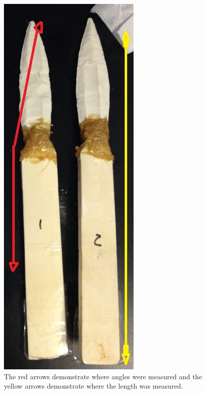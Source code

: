 \begin{figure}[!p]
	\centering
	\includegraphics[width=.5\linewidth]{figures/gagglioli_Fig5}
	\caption{The red arrows demonstrate where angles were measured and the yellow arrows demonstrate where the length was measured.}
	\label{fig:gagglioli_Fig5}
\end{figure}

